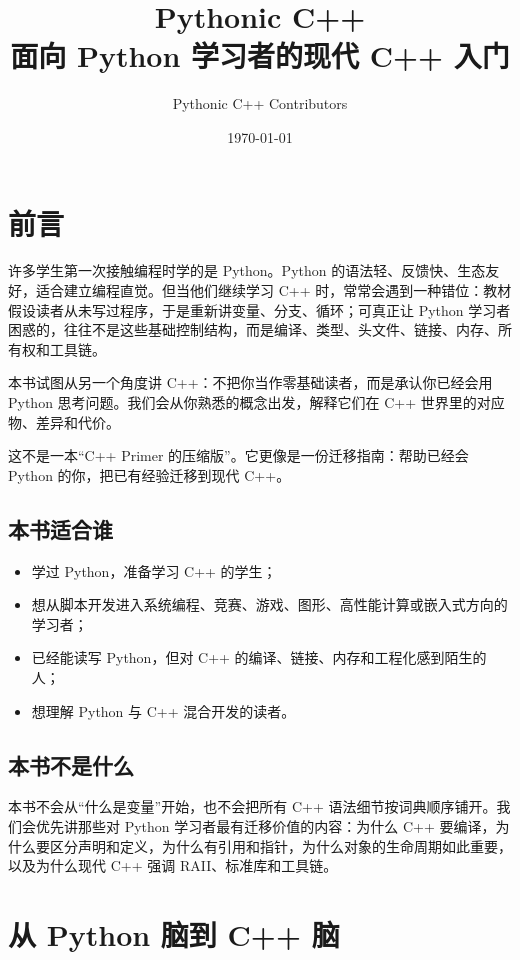 \documentclass[UTF8,openany]{ctexbook}
\title{Pythonic C++\\\large 面向 Python 学习者的现代 C++ 入门}
\author{Pythonic C++ Contributors}
\date{\today}
\begin{document}
\frontmatter
\maketitle
\tableofcontents

\chapter{前言}

许多学生第一次接触编程时学的是 Python。Python 的语法轻、反馈快、生态友好，适合建立编程直觉。但当他们继续学习 C++ 时，常常会遇到一种错位：教材假设读者从未写过程序，于是重新讲变量、分支、循环；可真正让 Python 学习者困惑的，往往不是这些基础控制结构，而是编译、类型、头文件、链接、内存、所有权和工具链。

本书试图从另一个角度讲 C++：不把你当作零基础读者，而是承认你已经会用 Python 思考问题。我们会从你熟悉的概念出发，解释它们在 C++ 世界里的对应物、差异和代价。

这不是一本“C++ Primer 的压缩版”。它更像是一份迁移指南：帮助已经会 Python 的你，把已有经验迁移到现代 C++。

\section*{本书适合谁}

\begin{itemize}[noitemsep]
  \item 学过 Python，准备学习 C++ 的学生；
  \item 想从脚本开发进入系统编程、竞赛、游戏、图形、高性能计算或嵌入式方向的学习者；
  \item 已经能读写 Python，但对 C++ 的编译、链接、内存和工程化感到陌生的人；
  \item 想理解 Python 与 C++ 混合开发的读者。
\end{itemize}

\section*{本书不是什么}

本书不会从“什么是变量”开始，也不会把所有 C++ 语法细节按词典顺序铺开。我们会优先讲那些对 Python 学习者最有迁移价值的内容：为什么 C++ 要编译，为什么要区分声明和定义，为什么有引用和指针，为什么对象的生命周期如此重要，以及为什么现代 C++ 强调 RAII、标准库和工具链。

\mainmatter

\chapter{从 Python 脑到 C++ 脑}
\end{document}
